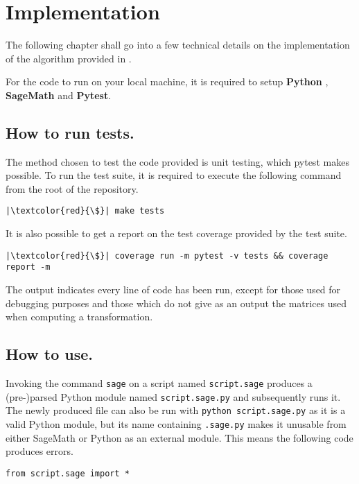 \section{Implementation}
The following chapter shall go into a few technical details on the implementation of the algorithm provided in
\cite{Trapani_Computation_of_Kronecker_s}.

For the code to run on your local machine, it is required to setup \textbf{Python} \cite{van1995python},
\textbf{SageMath} and \textbf{Pytest}.

\subsection*{How to run tests.}
The method chosen to test the code provided is unit testing, which pytest makes possible.
To run the test suite, it is required to execute the following command from the root of the repository.
\begin{verbatim}
|\textcolor{red}{\$}| make tests
\end{verbatim}

It is also possible to get a report on the test coverage provided by the test suite.
\begin{verbatim}
|\textcolor{red}{\$}| coverage run -m pytest -v tests && coverage report -m
\end{verbatim}

The output indicates every line of code has been run, except for those used for debugging purposes and those
which do not give as an output the matrices used when computing a transformation.

\subsection*{How to use.}
Invoking the command \texttt{sage} on a script named \texttt{script.sage} produces a (pre-)parsed
Python module named \texttt{script.sage.py} and subsequently runs it. The newly produced file can also
be run with \texttt{python script.sage.py} as it is a valid Python module, but its name containing
\texttt{.sage.py} makes it unusable from either SageMath or Python as an external module. This means the
following code produces errors.
\begin{verbatim}
from script.sage import *
\end{verbatim}

